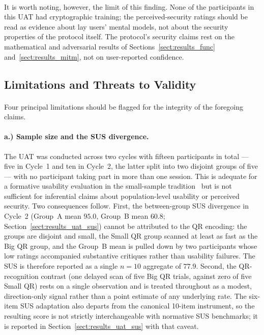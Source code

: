 \paragraph{}It is worth noting, however, the limit of this finding. None of the participants in this UAT had cryptographic training; the perceived-security ratings should be read as evidence about lay users' mental models, not about the security properties of the protocol itself. The protocol's security claims rest on the mathematical and adversarial results of Sections~\ref{sect:results_func} and~\ref{sect:results_mitm}, not on user-reported confidence.

\subsection{Limitations and Threats to Validity}
\label{sect:disc_limits}

\paragraph{}Four principal limitations should be flagged for the integrity of the foregoing claims.

\paragraph{a.) Sample size and the SUS divergence.}
The UAT was conducted across two cycles with fifteen participants in total --- five in Cycle~1 and ten in Cycle~2, the latter split into two disjoint groups of five --- with no participant taking part in more than one session. This is adequate for a formative usability evaluation in the small-sample tradition~\cite{brooke1996sus, bangor2008sus} but is not sufficient for inferential claims about population-level usability or perceived security. Two consequences follow. First, the between-group SUS divergence in Cycle~2 (Group~A mean $95.0$, Group~B mean $60.8$; Section~\ref{sect:results_uat_sus}) cannot be attributed to the QR encoding: the groups are disjoint and small, the Small QR group scanned at least as fast as the Big QR group, and the Group~B mean is pulled down by two participants whose low ratings accompanied substantive critiques rather than usability failures. The SUS is therefore reported as a single $n = 10$ aggregate of $77.9$. Second, the QR-recognition contrast (one delayed scan of five Big QR trials, against zero of five Small QR) rests on a single observation and is treated throughout as a modest, direction-only signal rather than a point estimate of any underlying rate. The six-item SUS adaptation also departs from the canonical 10-item instrument, so the resulting score is not strictly interchangeable with normative SUS benchmarks; it is reported in Section~\ref{sect:results_uat_sus} with that caveat.

